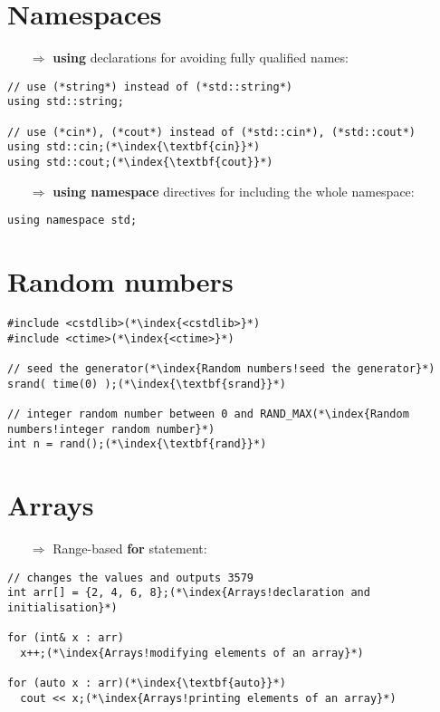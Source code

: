 \documentclass[10pt]{article}
\begin{document}
\section{Namespaces}
\small
\begin{enumerate}
\item[$\Rightarrow$] \textbf{using} declarations for avoiding fully qualified names:
\end{enumerate}
\begin{lstlisting}
// use (*string*) instead of (*std::string*)
using std::string;

// use (*cin*), (*cout*) instead of (*std::cin*), (*std::cout*)
using std::cin;(*\index{\textbf{cin}}*)
using std::cout;(*\index{\textbf{cout}}*)
\end{lstlisting}
\begin{enumerate}
\item[$\Rightarrow$] \textbf{using namespace} directives for including the whole namespace:
\end{enumerate}
\begin{lstlisting}
using namespace std;
\end{lstlisting}
%
%
\section{Random numbers}
\small
\begin{lstlisting}
#include <cstdlib>(*\index{<cstdlib>}*)
#include <ctime>(*\index{<ctime>}*)

// seed the generator(*\index{Random numbers!seed the generator}*)
srand( time(0) );(*\index{\textbf{srand}}*)

// integer random number between 0 and RAND_MAX(*\index{Random numbers!integer random number}*)
int n = rand();(*\index{\textbf{rand}}*)
\end{lstlisting}
%
%
\section{Arrays}
\small
\begin{enumerate}
\item[$\Rightarrow$] Range-based \textbf{for} statement:
\end{enumerate}
\begin{lstlisting}
// changes the values and outputs 3579
int arr[] = {2, 4, 6, 8};(*\index{Arrays!declaration and initialisation}*)

for (int& x : arr)
  x++;(*\index{Arrays!modifying elements of an array}*)

for (auto x : arr)(*\index{\textbf{auto}}*)
  cout << x;(*\index{Arrays!printing elements of an array}*)
\end{lstlisting}
%
%
\end{document}
